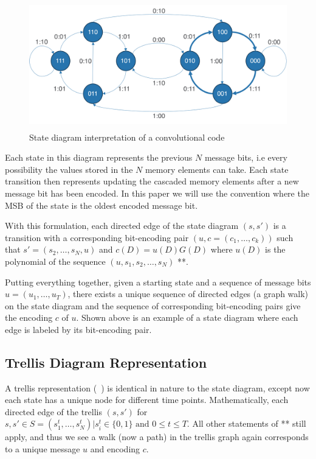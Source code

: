 \begin{figure}
\centering\CaptionFontSize
\includegraphics[height=15em]
{Figures/convolutional_code_state_diagram.png}
\caption[State diagram interpretation of a convolutional code]
{State diagram interpretation of a convolutional code}
\label{Figure:Background:ConvolutionalCodeStateDiagram}
\end{figure}

Each state in this diagram represents the previous $N$ message bits, i.e every possibility the values stored in the $N$ memory elements can take. Each state transition then represents updating the cascaded memory elements after a new message bit has been encoded. In this paper we will use the convention where the MSB of the state is the oldest encoded message bit. 

With this formulation, each directed edge of the state diagram $(s, s')$ is a transition with a corresponding bit-encoding pair $(u, c = (c_1, \ldots, c_k))$ such that $s' = (s_2, \ldots, s_N, u)$ and $c(D)=u(D)G(D)$ where $u(D)$ is the polynomial of the sequence $(u, s_1, s_2, \ldots, s_N)$ **. 

Putting everything together, given a starting state and a sequence of message bits $u = (u_1, \ldots, u_T)$, there exists a unique sequence of directed edges (a graph walk) on the state diagram and the sequence of corresponding bit-encoding pairs give the encoding $c$ of $u$. Shown above is an example of a state diagram where each edge is labeled by its bit-encoding pair.

\subsection{Trellis Diagram Representation}

A trellis representation (\Figure~) is identical in nature to the state diagram, except now each state has a unique node for different time points. Mathematically, each directed edge of the trellis $(s, s')$ for $s, s' \in S = (s^t_1, \ldots, s^t_N) | s^t_i \in \{0,1\} \text{  and  } 0 \leq t \leq T$. All other statements of ** still apply, and thus we see a walk (now a path) in the trellis graph again corresponds to a unique message $u$ and encoding $c$.

